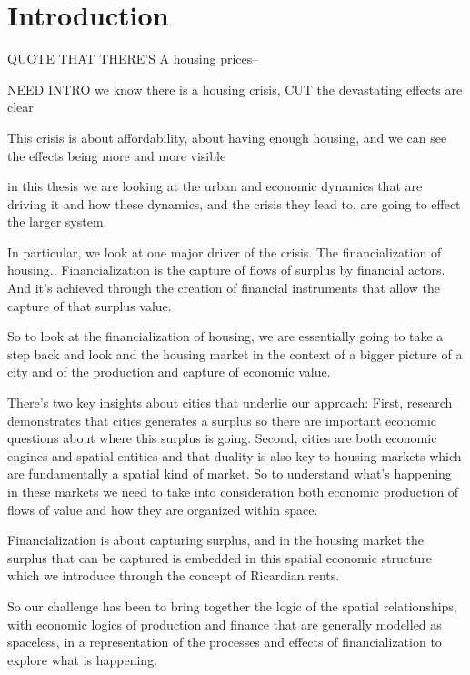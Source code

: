 \documentclass[]{article}
\begin{document}
 
\section{Introduction}
QUOTE THAT THERE'S A housing prices--

NEED INTRO
we know there is a housing crisis, CUT  the devastating effects are clear 

This crisis is about affordability, about having enough housing, 
and we can see the effects being more and more visible %

in this thesis we are looking at the urban and economic dynamics that are driving it and how  these dynamics, and the  crisis they lead to, are going to effect the larger system.

In particular, we look at one major driver of the crisis. The financialization of housing.. 
Financialization is the capture of flows of surplus by financial actors. And it's achieved through the creation of financial instruments that allow the capture of that surplus value. 

So to look at the financialization of housing,  we are essentially going to take a step back %
and look and the housing market in the context of a bigger picture of a city and of the production and capture of economic value.

There's two key insights about cities that underlie our approach: 
First, research demonstrates that cities  generates a surplus so there are important economic questions about where this surplus is going. 
Second, cities are both economic engines and spatial entities and that duality is also key to housing markets which are fundamentally a spatial kind of market. So to understand what's happening in these markets we need to take into consideration both economic production of flows of value and how they are organized within space. 

Financialization %
is about capturing surplus, and %
in the housing market the surplus that can be captured is embedded in this spatial economic structure which we introduce through the concept of Ricardian rents. 

So our challenge has been to bring together the logic of the spatial relationships,  with economic logics of production and finance that are generally modelled as spaceless,  in a representation of the processes and effects of  financialization to explore  what is happening.
\end{document}
